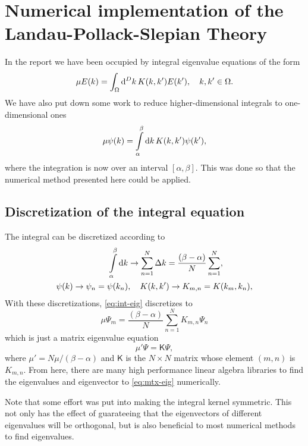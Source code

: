 \documentclass[11pt,a4paper, 
swedish,english %
]{article}
\begin{document}
\section{Numerical implementation of the 
Landau-Pollack-Slepian Theory}
\label{apx:num}
In the report we have been occupied by integral eigenvalue
equations of the form
\begin{equation} %
\mu E(k) 
= \oldint_{\Omega} \rd^D{k}\, K(k, k') E(k')
\qcomma k, k'\in\Omega.
\end{equation}
We have also put down some work to reduce higher-dimensional
integrals to one-dimensional ones
\begin{equation} \label{eq:int-eig}
\mu \psi(k) 
= \int_{\alpha}^\beta \rd{k}\, K(k, k') \psi(k'),
\end{equation}
where the integration is now over an interval 
$[\alpha, \beta]$. This was done so that the numerical method
presented here could be applied. 


\subsection{Discretization of the integral equation}
The integral can be discretized according to
\begin{equation} \label{eq:inttosum}
\begin{aligned}
 \int_{\alpha}^\beta \rd{k} &\to \sum_{n=1}^N\Delta{k}
=\frac{(\beta-\alpha)}{N} \sum_{n=1}^N,\\
\psi(k) \to \psi_n = \psi(k_n) &\qcomma
K(k, k') \to K_{m, n} = K(k_m, k_n),
\end{aligned}
\end{equation}
With these discretizations, \eqref{eq:int-eig} discretizes to
\begin{equation}
\mu\Psi_m = \frac{(\beta-\alpha)}{N} \sum_{n=1}^N K_{m, n} \Psi_n
\end{equation}
which is just a matrix eigenvalue equation
\begin{equation} \label{eq:mtx-eig}
\mu' \Psi = \mathsf{K}\Psi,
\end{equation}
where $\mu'=N\mu/(\beta-\alpha)$ and $\mathsf{K}$ is the $N\times N$ matrix
whose element $(m, n)$ is $K_{m, n}$. From here, there are many high
performance linear algebra libraries to find the eigenvalues and
eigenvector to \eqref{eq:mtx-eig} numerically. 

Note that some effort was put into making the integral
kernel symmetric. This not only has the effect of guarateeing that the
eigenvectors of different eigenvalues will be orthogonal, but is also
beneficial to most numerical methods to find eigenvalues. 
\end{document}
